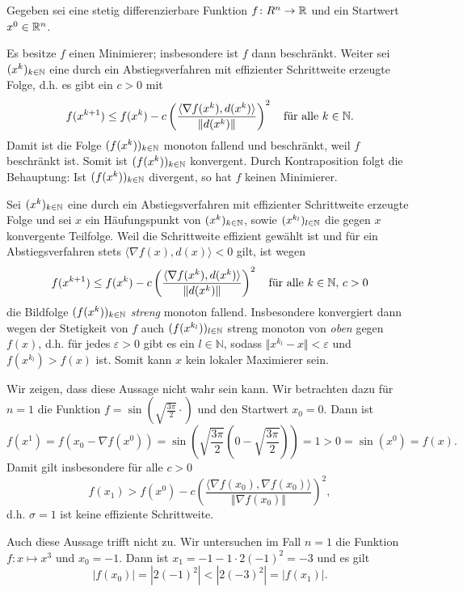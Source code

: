 
Gegeben sei eine stetig differenzierbare Funktion $f\colon R^n\to \mathbb{R}$
und ein Startwert $x^0\in\mathbb{R}^n$.\\
\begin{compactenum}[(i)]
 \item Es besitze $f$ einen Minimierer; insbesondere ist $f$ dann beschränkt.
 Weiter sei $(x^k)_{k\in\mathbb{N}}$ eine durch ein Abstiegsverfahren mit effizienter
 Schrittweite erzeugte Folge, d.h. es gibt ein $c>0$ mit
\begin{displaymath}
 f(x^{k+1})\leq f(x^k)-c\left(\frac{\langle\nabla f(x^k),d(x^k)\rangle}{\Vert d(x^k)\Vert}\right)^2 \quad\text{für alle }k\in\mathbb{N}.
\end{displaymath}
 Damit ist die Folge $(f(x^k))_{k\in\mathbb{N}}$ monoton fallend und beschränkt, weil
 $f$ beschränkt ist. Somit ist $(f(x^k))_{k\in\mathbb{N}}$ konvergent. Durch Kontraposition
 folgt die Behauptung: Ist $(f(x^k))_{k\in\mathbb{N}}$ divergent, so hat $f$ keinen Minimierer.
 \\
 \item Sei $(x^k)_{k\in\mathbb{N}}$ eine durch ein Abstiegsverfahren mit effizienter Schrittweite erzeugte
 Folge und sei $x$ ein Häufungspunkt von $(x^k)_{k\in\mathbb{N}}$, sowie $(x^{k_l})_{l\in\mathbb{N}}$ die gegen $x$ konvergente
 Teilfolge. Weil die Schrittweite effizient gewählt ist und für ein Abstiegsverfahren
  stets $\langle\nabla f(x),d(x)\rangle<0$ gilt, ist wegen
 \begin{displaymath}
 f(x^{k+1})\leq f(x^k)-c\left(\frac{\langle\nabla f(x^k),d(x^k)\rangle}{\Vert d(x^k)\Vert}\right)^2 \quad\text{für alle }k\in\mathbb{N}, \, c>0
\end{displaymath}
 die Bildfolge $(f(x^k))_{k\in\mathbb{N}}$ \textit{streng} monoton fallend. Insbesondere konvergiert dann wegen der Stetigkeit von $f$
 auch $(f(x^{k_l}))_{l\in\mathbb{N}}$ streng monoton von \textit{oben} gegen $f(x)$, d.h. für jedes $\varepsilon >0$ gibt es ein
 $l\in\mathbb{N}$, sodass $\Vert x^{k_l}-x\Vert <\varepsilon$ und $f(x^{k_l})>f(x)$ ist. Somit kann $x$ kein lokaler Maximierer sein.
 \\
 \item Wir zeigen, dass diese Aussage nicht wahr sein kann. Wir betrachten dazu für $n=1$
 die Funktion $f=\sin(\sqrt{\frac{3\pi}{2}}\cdot)$ und den Startwert $x_0=0$. Dann ist
 \begin{displaymath}
  f(x^1)=f(x_0-\nabla f(x^0))=\sin\left(\sqrt{\frac{3\pi}{2}}\left(0-\sqrt{\frac{3\pi}{2}}\right)\right)=1>0=\sin(x^0)=f(x).
 \end{displaymath}
 Damit gilt insbesondere für alle $c>0$
 \begin{displaymath}
 f(x_1)> f(x^0)-c\left(\frac{\langle\nabla f(x_0),\nabla f(x_0)\rangle}{\Vert \nabla f(x_0)\Vert}\right)^2,
\end{displaymath}
d.h. $\sigma=1$ ist keine effiziente Schrittweite.
\\
 \item Auch diese Aussage trifft nicht zu. Wir untersuchen im Fall $n=1$ die Funktion $f\colon x\mapsto x^3$ und $x_0=-1$.
 Dann ist $x_1=-1-1\cdot 2(-1)^2=-3$ und es gilt
 \begin{displaymath}
  |f(x_0)|=|2(-1)^2|<|2(-3)^2|=|f(x_1)|.
 \end{displaymath}

\end{compactenum}
